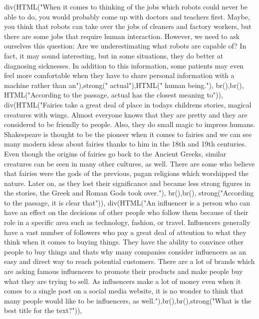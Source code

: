 \documentclass[
]{article}
\newenvironment{Shaded}{\begin{snugshade}}{\end{snugshade}}
\newcommand{\FunctionTok}[1]{\textcolor[rgb]{0.00,0.00,0.00}{#1}}
\newcommand{\NormalTok}[1]{#1}
\newcommand{\StringTok}[1]{\textcolor[rgb]{0.31,0.60,0.02}{#1}}
\begin{document}
\begin{Shaded}
\begin{Highlighting}[]
           \FunctionTok{div}\NormalTok{(}\FunctionTok{HTML}\NormalTok{(}\StringTok{"When it comes to thinking of the jobs which robots could never be able to do, you would probably come up with doctors and teachers first. Maybe, you think that robots can take over the jobs of cleaners and factory workers, but there are some jobs that require human interaction. However, we need to ask ourselves this question: Are we underestimating what robots are capable of? In fact, it may sound interesting, but in some situations, they do better at diagnosing sicknesses. In addition to this information, some patients may even feel more comfortable when they have to share personal information with a machine rather than an"}\NormalTok{),}\FunctionTok{strong}\NormalTok{(}\StringTok{" actual"}\NormalTok{),}\FunctionTok{HTML}\NormalTok{(}\StringTok{" human being."}\NormalTok{), }\FunctionTok{br}\NormalTok{(),}\FunctionTok{br}\NormalTok{(), }\FunctionTok{HTML}\NormalTok{(}\StringTok{"According to the passage, actual has the closest meaning to"}\NormalTok{)),}
           \FunctionTok{div}\NormalTok{(}\FunctionTok{HTML}\NormalTok{(}\StringTok{"Fairies take a great deal of place in todays childrens stories, magical creatures with wings. Almost everyone knows that they are pretty and they are considered to be friendly to people. Also, they do small magic to impress humans. Shakespeare is thought to be the pioneer when it comes to fairies and we can see many modern ideas about fairies thanks to him in the 18th and 19th centuries. Even though the origins of fairies go back to the Ancient Greeks, similar creatures can be seen in many other cultures, as well. There are some who believe that fairies were the gods of the previous, pagan religions which worshipped the nature. Later on, as they lost their significance and became less strong figures in the stories, the Greek and Roman Gods took over."}\NormalTok{), }\FunctionTok{br}\NormalTok{(),}\FunctionTok{br}\NormalTok{(), }\FunctionTok{strong}\NormalTok{(}\StringTok{"According to the passage, it is clear that"}\NormalTok{)),}
           \FunctionTok{div}\NormalTok{(}\FunctionTok{HTML}\NormalTok{(}\StringTok{"An influencer is a person who can have an effect on the decisions of other people who follow them because of their role in a specific area such as technology, fashion, or travel. Influencers generally have a vast number of followers who pay a great deal of attention to what they think when it comes to buying things. They have the ability to convince other people to buy things and thats why many companies consider influencers as an easy and direct way to reach potential customers. There are a lot of brands which are asking famous influencers to promote their products and make people buy what they are trying to sell. As influencers make a lot of money even when it comes to a single post on a social media website, it is no wonder to think that many people would like to be influencers, as well."}\NormalTok{),}\FunctionTok{br}\NormalTok{(),}\FunctionTok{br}\NormalTok{(),}\FunctionTok{strong}\NormalTok{(}\StringTok{"What is the best title for the text?"}\NormalTok{)),}

\end{Highlighting}
\end{Shaded}
\end{document}

